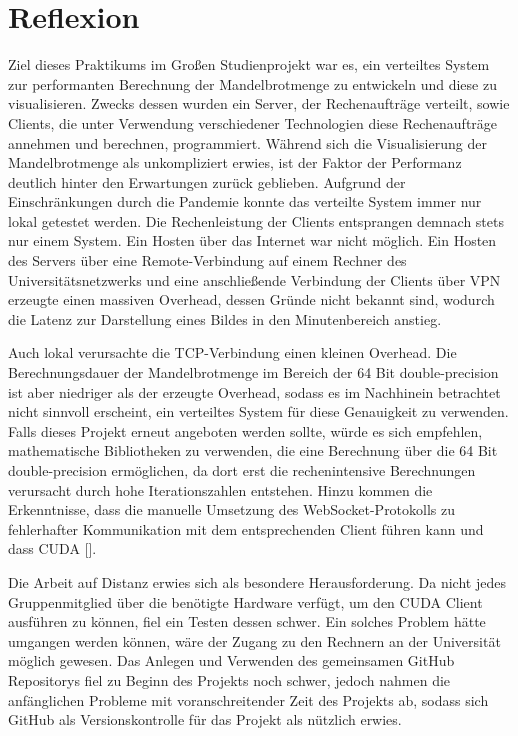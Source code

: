 \documentclass[12pt, onecolumn, notitlepage]{scrartcl}
\begin{document}
\section{Reflexion}
Ziel dieses Praktikums im Großen Studienprojekt war es, ein verteiltes System zur performanten Berechnung der Mandelbrotmenge zu entwickeln und diese zu visualisieren. Zwecks dessen wurden ein Server, der Rechenaufträge verteilt, sowie Clients, die unter Verwendung verschiedener Technologien diese Rechenaufträge annehmen und berechnen, programmiert. Während sich die Visualisierung der Mandelbrotmenge als unkompliziert erwies, ist der Faktor der Performanz deutlich hinter den Erwartungen zurück geblieben. Aufgrund der Einschränkungen durch die Pandemie konnte das verteilte System immer nur lokal getestet werden. Die Rechenleistung der Clients entsprangen demnach stets nur einem System. Ein Hosten über das Internet war nicht möglich. Ein Hosten des Servers über eine Remote-Verbindung auf einem Rechner des Universitätsnetzwerks und eine anschließende Verbindung der Clients über VPN erzeugte einen massiven Overhead, dessen Gründe nicht bekannt sind, wodurch die Latenz zur Darstellung eines Bildes in den Minutenbereich anstieg. \par 
Auch lokal verursachte die TCP-Verbindung einen kleinen Overhead. Die Berechnungsdauer der Mandelbrotmenge im Bereich der 64 Bit double-precision ist aber niedriger als der erzeugte Overhead, sodass es im Nachhinein betrachtet nicht sinnvoll erscheint, ein verteiltes System für diese Genauigkeit zu verwenden. Falls dieses Projekt erneut angeboten werden sollte, würde es sich empfehlen, mathematische Bibliotheken zu verwenden, die eine Berechnung über die 64 Bit double-precision ermöglichen, da dort erst die rechenintensive Berechnungen verursacht durch hohe Iterationszahlen entstehen. Hinzu kommen die Erkenntnisse, dass die manuelle Umsetzung des WebSocket-Protokolls zu fehlerhafter Kommunikation mit dem entsprechenden Client führen kann und dass CUDA []. \par 
Die Arbeit auf Distanz erwies sich als besondere Herausforderung. Da nicht jedes Gruppenmitglied über die benötigte Hardware verfügt, um den CUDA Client ausführen zu können, fiel ein Testen dessen schwer. Ein solches Problem hätte umgangen werden können, wäre der Zugang zu den Rechnern an der Universität möglich gewesen. Das Anlegen und Verwenden des gemeinsamen GitHub Repositorys fiel zu Beginn des Projekts noch schwer, jedoch nahmen die anfänglichen Probleme mit voranschreitender Zeit des Projekts ab, sodass sich GitHub als Versionskontrolle für das Projekt als nützlich erwies.

\nocite{*}
\end{document}
